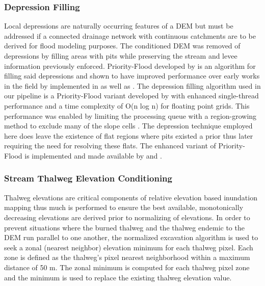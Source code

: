 \subsubsection{Depression Filling}
\label{sssec:depression_filling}
%
Local depressions are naturally occurring features of a DEM but must be addressed if a connected drainage network with continuous catchments are to be derived for flood modeling purposes.
The conditioned DEM was removed of depressions by filling areas with pits while preserving the stream and levee information previously enforced.
Priority-Flood developed by  is an algorithm for filling said depressions and shown to have improved performance over early works in the field by  implemented in  as well as .
The depression filling algorithm used in our pipeline is a Priority-Flood variant developed by \cite{zhou2016efficient} with enhanced single-thread performance and a time complexity of O(n log n) for floating point grids.
This performance was enabled by limiting the processing queue with a region-growing method to exclude many of the slope cells \cite{zhou2016efficient}.
The depression technique employed here does leave the existence of flat regions where pits existed a prior thus later requiring the need for resolving these flats.
The enhanced variant of Priority-Flood is implemented and made available by  and .
%
\subsubsection{Stream Thalweg Elevation Conditioning}
\label{sssec:stream_thalweg_elevation_conditioning}
%
Thalweg elevations are critical components of relative elevation based inundation mapping thus much is performed to ensure the best available, monotonically decreasing elevations are derived prior to normalizing of elevations.
In order to prevent situations where the burned thalweg and the thalweg endemic to the DEM run parallel to one another, the normalized excavation algorithm \cite{saunders1999preparation} is used to seek a zonal (nearest neighbor) elevation minimum for each thalweg pixel. 
Each zone is defined as the thalweg's pixel nearest neighborhood within a maximum distance of 50 m.
The zonal minimum is computed for each thalweg pixel zone and the minimum is used to replace the existing thalweg elevation value.

